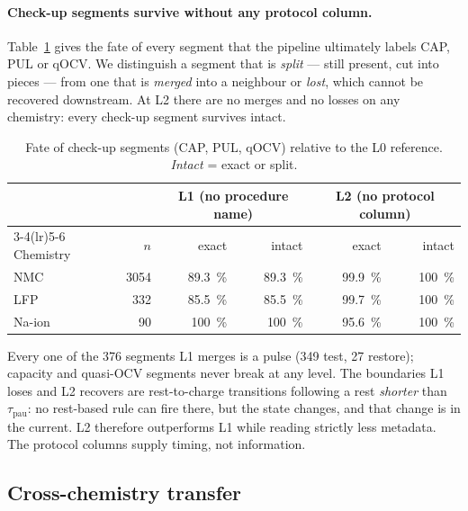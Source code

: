 \documentclass[preprint,3p,number]{elsarticle}
\begin{document}
\paragraph{Check-up segments survive without any protocol column.}
Table~\ref{tab:checkup} gives the fate of every segment that the pipeline
ultimately labels CAP, PUL or qOCV. We distinguish a segment that is
\emph{split} --- still present, cut into pieces --- from one that is
\emph{merged} into a neighbour or \emph{lost}, which cannot be recovered
downstream. At L2 there are no merges and no losses on any chemistry: every
check-up segment survives intact.

\begin{table}[t]
\centering
\caption{Fate of check-up segments (CAP, PUL, qOCV) relative to the L0
reference. \emph{Intact} = exact or split.}
\label{tab:checkup}
\begin{tabular}{lrrrrr}
\toprule
& & \multicolumn{2}{c}{L1 (no procedure name)} & \multicolumn{2}{c}{L2 (no protocol column)} \\
\cmidrule(lr){3-4}\cmidrule(lr){5-6}
Chemistry & $n$ & exact & intact & exact & intact \\
\midrule
NMC    & \num{3054} & \SI{89.3}{\percent} & \SI{89.3}{\percent} & \SI{99.9}{\percent} & \SI{100}{\percent} \\
LFP    & \num{332}  & \SI{85.5}{\percent} & \SI{85.5}{\percent} & \SI{99.7}{\percent} & \SI{100}{\percent} \\
Na-ion & \num{90}   & \SI{100}{\percent}  & \SI{100}{\percent}  & \SI{95.6}{\percent} & \SI{100}{\percent} \\
\bottomrule
\end{tabular}
\end{table}

Every one of the \num{376} segments L1 merges is a pulse (\num{349} test,
\num{27} restore); capacity and quasi-OCV segments never break at any level. The
boundaries L1 loses and L2 recovers are rest-to-charge transitions following a
rest \emph{shorter} than $\tau_{\mathrm{pau}}$: no rest-based rule can fire
there, but the state changes, and that change is in the current. L2 therefore
outperforms L1 while reading strictly less metadata. The protocol columns supply
timing, not information.

\subsection{Cross-chemistry transfer}
\label{sec:res-loco}
\end{document}
